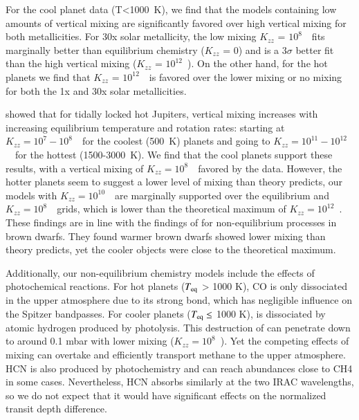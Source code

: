 For the cool planet data (T<1000~K), we find that the models containing low amounts of vertical mixing are significantly favored over high vertical mixing for both metallicities. For 30x solar metallicity, the low mixing $K_{zz}$ = $10^8$~\cmcms~fits marginally better than equilibrium chemistry ($K_{zz}$ = 0) and is a 3$\sigma$ better fit than the high vertical mixing ($K_{zz}$ = $10^{12}$~\cmcms). On the other hand, for the hot planets we find that $K_{zz}$ = $10^{12}$~\cmcms~is favored over the lower mixing or no mixing for both the 1x and 30x solar metallicities.

\citet{Komacek2019} showed that for tidally locked hot Jupiters, vertical mixing increases with increasing equilibrium temperature and rotation rates: starting at $K_{zz} = 10^{7}-10^{8}$~\cmcms~for the coolest (500~K) planets and going to $K_{zz} = 10^{11}-10^{12}$~\cmcms~for the hottest (1500-3000~K). We find that the cool planets support these results, with a vertical mixing of $K_{zz} = 10^{8}$~\cmcms~favored by the data. However, the hotter planets seem to suggest a lower level of mixing than theory predicts, our models with $K_{zz} = 10^{10}$~\cmcms~are marginally supported over the equilibrium and $K_{zz} = 10^{8}$~\cmcms~grids, which is lower than the theoretical maximum of $K_{zz} = 10^{12}$~\cmcms. These findings are in line with the findings of \citet{Miles2020} for non-equilibrium processes in brown dwarfs. They found warmer brown dwarfs showed lower mixing than theory predicts, yet the cooler objects were close to the theoretical maximum.

Additionally, our non-equilibrium chemistry models include the effects of photochemical reactions. For hot planets ($T_{\rm eq}$ > 1000 K), CO is only dissociated in the upper atmosphere due to its strong bond, which has negligible influence on the Spitzer bandpasses. For cooler planets ($T_{\rm eq} \leq$ 1000 K),  is dissociated by atomic hydrogen produced by photolysis. This destruction of  can penetrate down to around 0.1 mbar with lower mixing ($K_{zz}=10^{8}$~\cmcms). Yet the competing effects of mixing can overtake and efficiently transport methane to the upper atmosphere. HCN is also produced by photochemistry and can reach abundances close to CH4 in some cases. Nevertheless, HCN absorbs similarly at the two IRAC wavelengths, so we do not expect that it would have significant effects on the normalized transit depth difference.

